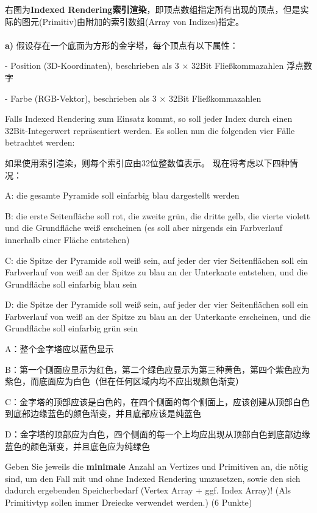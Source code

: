 \documentclass[fleqn]{article}
\begin{document}
右图为\textbf{Indexed Rendering索引渲染}，即顶点数组指定所有出现的顶点，但是实际的图元(Primitiv)由附加的索引数组(Array von Indizes)指定。
\\
\\
\textbf{a)} 假设存在一个底面为方形的金字塔，每个顶点有以下属性：

- Position (3D-Koordinaten), beschrieben als 3 $\times$ 32Bit Fließkommazahlen 浮点数字

- Farbe (RGB-Vektor), beschrieben als 3 $\times$ 32Bit Fließkommazahlen

Falls Indexed Rendering zum Einsatz kommt, so soll jeder Index durch einen 32Bit-Integerwert repräsentiert werden. Es sollen nun die folgenden vier Fälle betrachtet werden:

如果使用索引渲染，则每个索引应由32位整数值表示。 现在将考虑以下四种情况：

A: die gesamte Pyramide soll einfarbig blau dargestellt werden

B: die erste Seitenfläche soll rot, die zweite grün, die dritte gelb, die vierte violett und die Grundfläche weiß erscheinen (es soll aber nirgends ein Farbverlauf innerhalb einer Fläche entstehen)

C: die Spitze der Pyramide soll weiß sein, auf jeder der vier Seitenflächen soll ein Farbverlauf von weiß an der Spitze zu blau an der Unterkante entstehen, und die Grundfläche soll einfarbig blau sein

D: die Spitze der Pyramide soll weiß sein, auf jeder der vier Seitenflächen soll ein Farbverlauf von weiß an der Spitze zu blau an der Unterkante erscheinen, und die Grundfläche soll einfarbig grün sein

A：整个金字塔应以蓝色显示

B：第一个侧面应显示为红色，第二个绿色应显示为第三种黄色，第四个紫色应为紫色，而底面应为白色（但在任何区域内均不应出现颜色渐变）

C：金字塔的顶部应该是白色的，在四个侧面的每个侧面上，应该创建从顶部白色到底部边缘蓝色的颜色渐变，并且底部应该是纯蓝色

D：金字塔的顶部应为白色，四个侧面的每一个上均应出现从顶部白色到底部边缘蓝色的颜色渐变，并且底色应为纯绿色

Geben Sie jeweils die \textbf{minimale} Anzahl an Vertizes und Primitiven an, die nötig sind, um den Fall mit und ohne Indexed Rendering umzusetzen, sowie den sich dadurch ergebenden Speicherbedarf (Vertex Array + ggf. Index Array)! (Als Primitivtyp sollen immer Dreiecke verwendet werden.) (6 Punkte)
\end{document}

